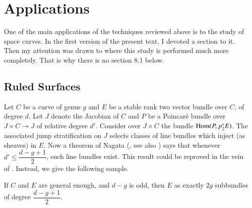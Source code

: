 \section{Applications}\label{chap6-sec8}

One of the main applications of the techniques reviewed above is to
the study of space curves. In the first version of the present text, I
devoted a section to it. Then my attention was drawn
to \cite{chap6-Ha} where this study is performed much more
completely. That is why there is no section 8.1 below.

\setcounter{subsection}{1}
\subsection{Ruled Surfaces}\label{chap6-sec8.2}

Let $C$ be a curve of genus $g$ and $E$ be a stable rank two vector
bundle over $C$, of degree $d$. Let $J$ denote the Jacobian of $C$ and
$P$ be a Poincar\'e bundle over $J\times C\to J$ of relative degree
$d'$. Consider over $J\times C$ the bundle
$\operatorname{Hom}(P,p^{\ast}_{2}E)$. The associated jump stratification on $J$
selects classes of line bundles which inject (as sheaves) in $E$. Now
a theorem of Nagata (\cite{chap6-N}, see
also \cite{chap6-St} \cite{chap6-Gu} \cite{chap6-LN} \cite{chap6-L2})
says that whenever $d'\leq \dfrac{d-g+1}{2}$, such line bundles
exist. This result could be reproved in the vein
of \cite{chap6-K1L}. Instead, we give the following sample.

\begin{theorem*}
If $C$ and $E$ are general enough, and $d-g$ is odd, then $E$ as
exactly $2g$ subbundles of degree $\dfrac{d-g+1}{2}$.
\end{theorem*}


